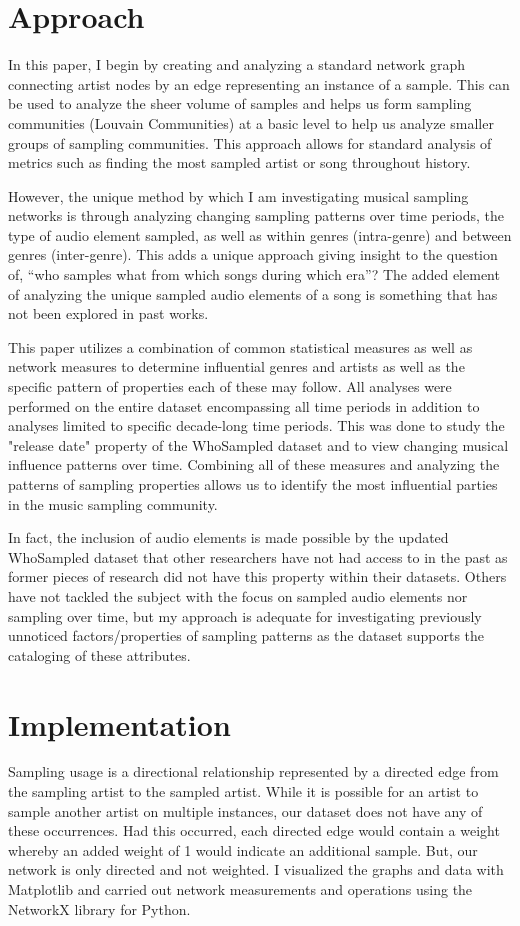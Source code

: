 \documentclass[pageno]{jpaper}
\begin{document}
\section{Approach}
In this paper, I begin by creating and analyzing a standard network graph connecting artist nodes by an edge representing an instance of a sample. This can be used to analyze the sheer volume of samples and helps us form sampling communities (Louvain Communities) at a basic level to help us analyze smaller groups of sampling communities. This approach allows for standard analysis of metrics such as finding the most sampled artist or song throughout history. 

However, the unique method by which I am investigating musical sampling networks is through analyzing changing sampling patterns over time periods, the type of audio element sampled, as well as within genres (intra-genre) and between genres (inter-genre). This adds a unique approach giving insight to the question of, “who samples what from which songs during which era”? The added element of analyzing the unique sampled audio elements of a song is something that has not been explored in past works.

This paper utilizes a combination of common statistical measures as well as network measures to determine influential genres and artists as well as the specific pattern of properties each of these may follow. All analyses were performed on the entire dataset encompassing all time periods in addition to analyses limited to specific decade-long time periods. This was done to study the "release date" property of the WhoSampled dataset and to view changing musical influence patterns over time. Combining all of these measures and analyzing the patterns of sampling properties allows us to identify the most influential parties in the music sampling community.

In fact, the inclusion of audio elements is made possible by the updated WhoSampled dataset that other researchers have not had access to in the past as former pieces of research did not have this property within their datasets. Others have not tackled the subject with the focus on sampled audio elements nor sampling over time, but my approach is adequate for investigating previously unnoticed factors/properties of sampling patterns as the dataset supports the cataloging of these attributes.

\section{Implementation}
Sampling usage is a directional relationship represented by a directed edge from the sampling artist to the sampled artist. While it is possible for an artist to sample another artist on multiple instances, our dataset does not have any of these occurrences. Had this occurred, each directed edge would contain a weight whereby an added weight of 1 would indicate an additional sample. But, our network is only directed and not weighted. I visualized the graphs and data with Matplotlib and carried out network measurements and operations using the NetworkX library for Python. \cite{NetworkX,Matplotlib}
\end{document}
